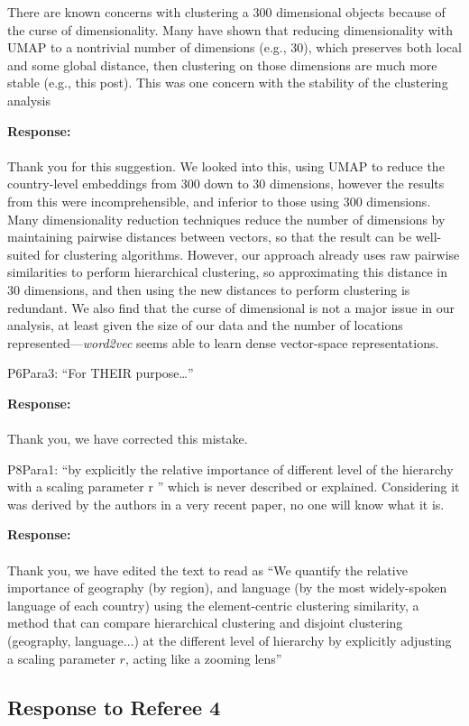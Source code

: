 \documentclass[12pt,a4paper]{article}
\newcommand{\response}[1]{{\noindent \textbf{Response:} \\ \\ \noindent #1}}
\newcommand{\rcomment}[1]{%
\vspace{10pt}
\begin{tcolorbox}[colback=black!3,colframe=white!45!black, left=0pt, right=0pt, top=0pt, bottom=0pt, arc=0pt,outer arc=0pt, grow to left by=-0.5cm,grow to right by=-0.5cm]
#1
\end{tcolorbox}
}
\begin{document}
\rcomment{
There are known concerns with clustering a 300 dimensional objects because of the curse of
dimensionality. Many have shown that reducing dimensionality with UMAP to a nontrivial
number of dimensions (e.g., 30), which preserves both local and some global distance, then
clustering on those dimensions are much more stable (e.g., this post). This was one
concern with the stability of the clustering analysis


}

\response{Thank you for this suggestion. 
We looked into this, using UMAP to reduce the country-level embeddings from 300 down to 30 dimensions, however the results from this were incomprehensible, and inferior to those using 300 dimensions. 
Many dimensionality reduction techniques reduce the number of dimensions by maintaining pairwise distances between vectors, so that the result can be well-suited for clustering algorithms. 
However, our approach already uses raw pairwise similarities to perform hierarchical clustering, so approximating this distance in 30 dimensions, and then using the new distances to perform clustering is redundant. 
We also find that the curse of dimensional is not a major issue in our analysis, at least given the size of our data and the number of locations represented---\textit{word2vec} seems able to learn dense vector-space representations.
}

\rcomment{
P6Para3: “For THEIR purpose…”
}

\response{Thank you, we have corrected this mistake. 
}

\rcomment{
P8Para1: “by explicitly the relative importance of different level of the hierarchy with a scaling parameter r ” which is never described or explained. Considering it was derived by the authors in a very recent paper, no one will know what it is.
}

\response{Thank you, we have edited the text to read as “We quantify the relative importance of geography (by region), and language (by the most widely-spoken language of each country) using the element-centric clustering similarity, a method that can compare hierarchical clustering and disjoint clustering (geography, language...) at the different level of hierarchy by explicitly adjusting a scaling parameter $r$, acting like a zooming lens”
}

\subsection{Response to Referee 4}
\end{document}
